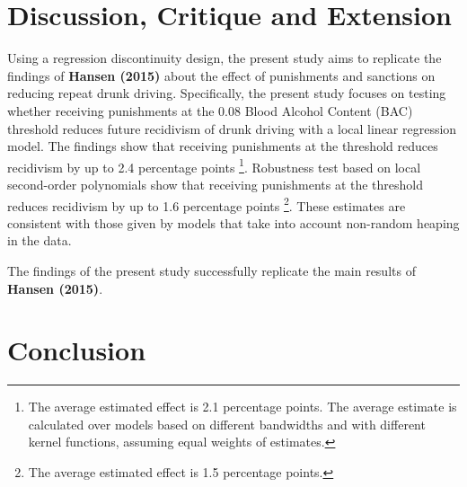 \documentclass[
  11pt,
]{article}
\begin{document}
\endgroup

\hypertarget{discussion-critique-and-extension}{%
\section{Discussion, Critique and
Extension}\label{discussion-critique-and-extension}}

Using a regression discontinuity design, the present study aims to
replicate the findings of \textbf{Hansen (2015)} about the effect of
punishments and sanctions on reducing repeat drunk driving.
Specifically, the present study focuses on testing whether receiving
punishments at the 0.08 Blood Alcohol Content (BAC) threshold reduces
future recidivism of drunk driving with a local linear regression model.
The findings show that receiving punishments at the threshold reduces
recidivism by up to 2.4 percentage points
\footnote{The average estimated effect is 2.1 percentage points. The average estimate is calculated over models based on different bandwidths and with different kernel functions, assuming equal weights of estimates.}.
Robustness test based on local second-order polynomials show that
receiving punishments at the threshold reduces recidivism by up to 1.6
percentage points
\footnote{The average estimated effect is 1.5 percentage points.}. These
estimates are consistent with those given by models that take into
account non-random heaping in the data.

The findings of the present study successfully replicate the main
results of \textbf{Hansen (2015)}.

\hypertarget{conclusion}{%
\section{Conclusion}\label{conclusion}}
\end{document}
